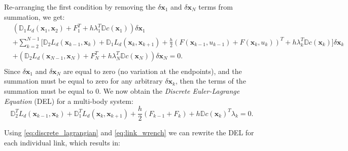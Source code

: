 \documentclass[../root.tex]{subfiles}
\begin{document}
Re-arranging the first condition by removing the $\delta \mathbf{x}_1$ and 
$\delta \mathbf{x}_N$ terms from summation, we get:
\begin{equation}
\begin{aligned}
    &\left(\mathbb{D}_1 L_d(\mathbf{x}_1, \mathbf{x}_2) 
      + F_1^T + h \lambda_1^T \mathbb{D} c(\mathbf{x}_1) 
     \right) \delta \mathbf{x}_1 \\
    & +\sum_{k=2}^{N-1} \Big[ \mathbb{D}_2 L_d(\mathbf{x}_{k-1}, \mathbf{x}_k) 
       + \mathbb{D}_1 L_d(\mathbf{x}_{k}, \mathbf{x}_{k+1}) 
        + \frac{h}{2} (F(\mathbf{x}_{k-1}, u_{k-1}) + F(\mathbf{x}_k, u_k))^T 
                     + h \lambda_k^T \mathbb{D} c(\mathbf{x}_k) 
    \Big] \delta \mathbf{x}_k \\
    &+ \left(\mathbb{D}_2 L_d(\mathbf{x}_{N-1}, \mathbf{x}_N) 
     + F_N^T + h \lambda_N^T \mathbb{D}c(\mathbf{x}_N)\right) \delta \mathbf{x}_N = 0. \\
\end{aligned}
\end{equation}
Since $\delta \mathbf{x}_1$ and $\delta \mathbf{x}_N$ are equal to zero 
(no variation at the endpoints), and the summation must be equal to zero for any 
arbitrary $\delta \mathbf{x}_k$, then the terms of the summation must be equal to 0. We now obtain
the \textit{Discrete Euler-Lagrange Equation} (DEL) for a multi-body system:
\begin{equation}
    \mathbb{D}_2^T L_d(\mathbf{x}_{k-1}, \mathbf{x}_k)
       + \mathbb{D}_1^T L_d(\mathbf{x}_{k}, \mathbf{x}_{k+1}) 
       + \frac{h}{2} (F_{k-1} + F_k) + h \mathbb{D} c(\mathbf{x}_k)^T \lambda_k  = 0.
\end{equation}

Using \eqref{eq:discrete_lagrangian} and \eqref{eq:link_wrench} we can rewrite the DEL for
each individual link, which results in:
\end{document}
